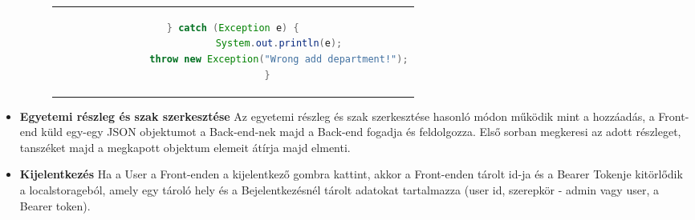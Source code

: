 \begin{itemize}
\begin{figure}[thp]
\begin{tabular}{c}
\begin{lstlisting}[language=JAVA]
			} catch (Exception e) {
				System.out.println(e);
				throw new Exception("Wrong add department!");
			}
		\end{lstlisting}
	\end{tabular}
\end{figure}

	\item \textbf{Egyetemi részleg és szak szerkesztése}
Az egyetemi részleg és szak szerkesztése hasonló módon működik mint a hozzáadás, a Front-end küld egy-egy JSON objektumot a Back-end-nek majd a Back-end fogadja és feldolgozza. Első sorban megkeresi az adott részleget, tanszéket majd a megkapott objektum elemeit átírja majd elmenti.
	
	\item \textbf{Kijelentkezés}
Ha a User a Front-enden a kijelentkező gombra kattint, akkor a Front-enden tárolt id-ja és a Bearer Tokenje kitörlődik a localstorageból, amely egy tároló hely és a Bejelentkezésnél tárolt adatokat tartalmazza (user id, szerepkör - admin vagy user, a Bearer token). 
	
\end{itemize}
